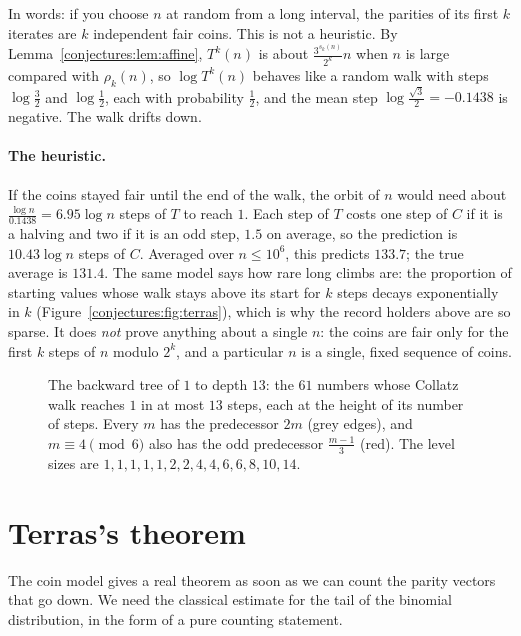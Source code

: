 In words: if you choose $n$ at random from a long interval, the parities of its first $k$ iterates are $k$ independent fair coins. This is not a
heuristic. By Lemma~\ref{conjectures:lem:affine}, $T^k(n)$ is about $\frac{3^{s_k(n)}}{2^k}n$ when $n$ is large compared with $\rho_k(n)$, so $\log T^k(n)$ behaves
like a random walk with steps $\log\frac32$ and $\log\frac12$, each with probability $\frac12$, and the mean step $\log\frac{\sqrt3}2=-0.1438$ is
negative. The walk drifts down.

\paragraph{The heuristic.} If the coins stayed fair until the end of the walk, the orbit of $n$ would need about $\frac{\log n}{0.1438}=6.95\log n$
steps of $T$ to reach $1$. Each step of $T$ costs one step of $C$ if it is a halving and two if it is an odd step, $1.5$ on average, so the prediction is
$10.43\log n$ steps of $C$. Averaged over $n\le10^6$, this predicts $133.7$; the true average is $131.4$. The same model says how rare long climbs are: the
proportion of starting values whose walk stays above its start for $k$ steps decays exponentially in $k$ (Figure~\ref{conjectures:fig:terras}), which is why the
record holders above are so sparse. It does \emph{not} prove anything about a single $n$: the coins
are fair only for the first $k$ steps of $n$ modulo $2^k$, and a particular $n$ is a single, fixed sequence of coins.

\begin{figure}[ht]
\centering
{}
\caption{The backward tree of $1$ to depth $13$: the $61$ numbers whose Collatz walk reaches $1$ in at most $13$ steps, each at the height of its number
of steps. Every $m$ has the predecessor $2m$ (grey edges), and $m\equiv4\pmod6$ also has the odd predecessor $\frac{m-1}3$ (red). The level sizes are
$1,1,1,1,1,2,2,4,4,6,6,8,10,14$.}
\label{conjectures:fig:tree}
\end{figure}

\section{Terras's theorem}

The coin model gives a real theorem as soon as we can count the parity vectors that go down. We need the classical estimate for the tail of the binomial
distribution, in the form of a pure counting statement.

